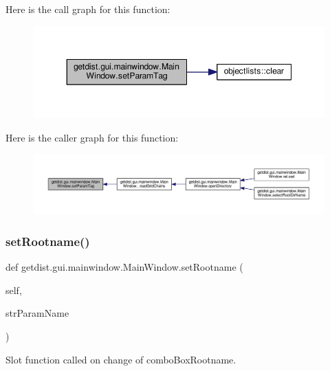 Here is the call graph for this function\+:
\nopagebreak
\begin{figure}[H]
\begin{center}
\leavevmode
\includegraphics[width=348pt]{classgetdist_1_1gui_1_1mainwindow_1_1MainWindow_aceae6c103872070c2383fffa54ee75e9_cgraph}
\end{center}
\end{figure}
Here is the caller graph for this function\+:
\nopagebreak
\begin{figure}[H]
\begin{center}
\leavevmode
\includegraphics[width=350pt]{classgetdist_1_1gui_1_1mainwindow_1_1MainWindow_aceae6c103872070c2383fffa54ee75e9_icgraph}
\end{center}
\end{figure}
\mbox{\label{classgetdist_1_1gui_1_1mainwindow_1_1MainWindow_ae2ff20b5ea04f3dbb46a6e6e447e34d7}} 
\subsubsection{\texorpdfstring{set\+Rootname()}{setRootname()}}
{\footnotesize\ttfamily def getdist.\+gui.\+mainwindow.\+Main\+Window.\+set\+Rootname (\begin{DoxyParamCaption}\item[{}]{self,  }\item[{}]{str\+Param\+Name }\end{DoxyParamCaption})}

\begin{DoxyVerb}Slot function called on change of comboBoxRootname.
\end{DoxyVerb}
 

